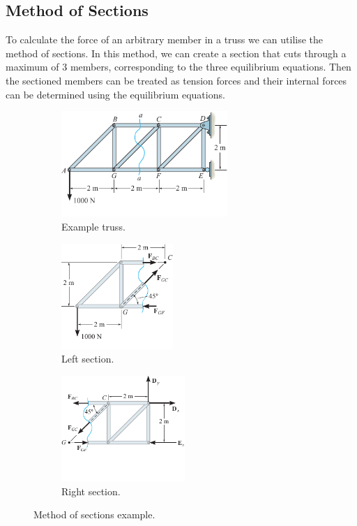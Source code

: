 \documentclass{article}
\begin{document}
\subsection{Method of Sections}
To calculate the force of an arbitrary member in a truss we can utilise the method of sections.
In this method, we can create a section that cuts through a maximum of 3 members, corresponding to
the three equilibrium equations. Then the sectioned members can be treated as tension forces and
their internal forces can be determined using the equilibrium equations.
\begin{figure}[H]
    \centering
    \begin{subfigure}{\linewidth}
        \centering
        \includegraphics[height = 4cm, keepaspectratio = true]{figures/method_of_sections_full.pdf}
        \caption{Example truss.}
    \end{subfigure}

    \vspace*{1.5em}
    \begin{subfigure}{0.48\linewidth}
        \centering
        \includegraphics[height = 4cm, keepaspectratio = true]{figures/method_of_sections_left_section.pdf}
        \caption{Left section.}
    \end{subfigure}
    \begin{subfigure}{0.48\linewidth}
        \centering
        \includegraphics[height = 4cm, keepaspectratio = true]{figures/method_of_sections_right_section.pdf}
        \caption{Right section.}
    \end{subfigure}
    \caption{Method of sections example.} %
\end{figure}
\end{document}
